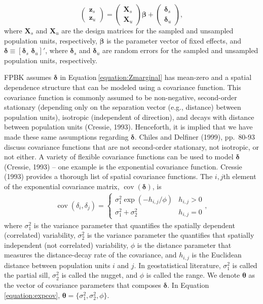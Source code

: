 \documentclass[]{elsarticle} %
\begin{document}
\begin{equation}
\begin{pmatrix} \label{equation:Zmarginal}
    \mathbf{z}_s      \\
    \mathbf{z}_u
\end{pmatrix}
=
\begin{pmatrix}
  \mathbf{X}_s    \\
  \mathbf{X}_u
\end{pmatrix}
\bm{\beta} +
\begin{pmatrix}
\bm{\delta}_s    \\
\bm{\delta}_u
\end{pmatrix},
\end{equation} where \(\mathbf{X}_s\) and \(\mathbf{X}_u\) are the
design matrices for the sampled and unsampled population units,
respectively, \(\bm{\beta}\) is the parameter vector of fixed effects,
and \(\bm{\delta} \equiv [\bm{\delta}_s \,\, \bm{\delta}_u]'\), where
\(\bm{\delta}_s\) and \(\bm{\delta}_u\) are random errors for the
sampled and unsampled population units, respectively.

FPBK assumes \(\bm{\delta}\) in Equation\(~\)\eqref{equation:Zmarginal}
has mean-zero and a spatial dependence structure that can be modeled
using a covariance function. This covariance function is commonly
assumed to be non-negative, second-order stationary (depending only on
the separation vector (e.g., distance) between population units),
isotropic (independent of direction), and decays with distance between
population units (Cressie, 1993). Henceforth, it is implied that we have
made these same assumptions regarding \(\bm{\delta}\). Chiles and
Delfiner (1999), pp.~80-93 discuss covariance functions that are not
second-order stationary, not isotropic, or not either. A variety of
flexible covariance functions can be used to model \(\bm{\delta}\)
(Cressie, 1993) -- one example is the exponential covariance function.
Cressie (1993) provides a thorough list of spatial covariance functions.
The \(i,j\)th element of the exponential covariance matrix,
\(\mathop{\mathrm{{cov}}}(\bm{\delta})\), is \mbox{}
\begin{align}\label{equation:expcov}
\mathop{\mathrm{{cov}}}(\delta_i, \delta_j) = 
\begin{cases} 
\sigma^2_{1}\exp(-h_{i,j}/\phi) & h_{i,j} > 0 \\
\sigma^2_{1} + \sigma^2_2 & h_{i,j} = 0
\end{cases}
,
\end{align} where \(\sigma^2_{1}\) is the variance parameter that
quantifies the spatially dependent (correlated) variability,
\(\sigma^2_{2}\) is the variance parameter the quantifies that spatially
independent (not correlated) variability, \(\phi\) is the distance
parameter that measures the distance-decay rate of the covariance, and
\(h_{i,j}\) is the Euclidean distance between population units \(i\) and
\(j\). In geostatistical literature, \(\sigma^2_{1}\) is called the
partial sill, \(\sigma^2_{2}\) is called the nugget, and \(\phi\) is
called the range. We denote \(\bm{\theta}\) as the vector of covariance
parameters that composes \(\bm{\delta}\). In
Equation\(~\)\ref{equation:expcov},
\(\bm{\theta} = \{\sigma^2_1, \sigma^2_2, \phi \}\).
\end{document}
